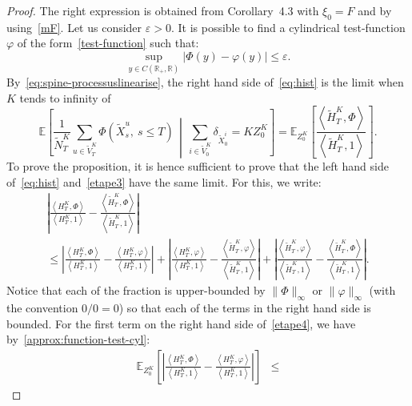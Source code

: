 \documentclass[10pt]{amsart}
\theoremstyle{definition}\newtheorem{defi}[theo]{Definition}\newtheorem{rema}[theo]{Remark}\newtheorem{exam}[theo]{Example}\newtheorem{exem}[theo]{Example}\newtheorem{nota}[theo]{Notation}
\newcommand*\R{\mathbb{R}}
\newcommand*\E{\mathbb{E}}
\begin{document}
\begin{proof}
The right expression is obtained from Corollary~4.3 with $\xi_{0}=F$ and by using~\eqref{mF}. Let us consider $\varepsilon>0$. It is possible to find a cylindrical test-function $\varphi$ of the form~\eqref{test-function} such that:
\begin{equation}\label{approx:function-test-cyl}
\sup_{y \in C(\R_+, \R)} \big|\Phi(y)-\varphi(y)\big|\leq \varepsilon.
\end{equation}
By~\eqref{eq:spine-processuslinearise}, the right hand side of~\eqref{eq:hist} is the limit when $K$ tends to infinity of
\begin{equation}\label{etape3}
\E\left[\frac{1}{\widetilde{N}^K_{T}}\sum_{u \in  \widetilde{V}^K_{T}}\Phi\left(\widetilde X^u_{s},\ s\leq T\right) \, \middle|\, \sum_{i \in \widetilde V^K_{0}} \delta_{\widetilde{X}^i_{0}}= K Z^K_0 \right] =\E_{Z^K_0}\left[\frac{\left\langle \widetilde{H}^K_T,\Phi\right\rangle}{\left\langle \widetilde{H}^K_T,1\right\rangle} \right].
\end{equation}
To prove the proposition, it is hence sufficient to prove that the left hand side of~\eqref{eq:hist} and~\eqref{etape3} have the same limit. For this, we write:
\begin{multline}\label{etape4}
\left| \frac{\left\langle H^K_T,\Phi\right\rangle}{\left\langle H^K_T,1\right\rangle} - \frac{\left\langle \widetilde{H}^K_T,\Phi\right\rangle}{\left\langle \widetilde{H}^K_T,1\right\rangle}\right|\\
\leq \left| \frac{\left\langle H^K_T,\Phi\right\rangle}{\left\langle H^K_T,1\right\rangle} - \frac{\left\langle H^K_T,\varphi\right\rangle}{\left\langle H^K_T,1\right\rangle}\right| + \left|\frac{\left\langle H^K_T,\varphi\right\rangle}{\left\langle H^K_T,1\right\rangle}-\frac{\left\langle \widetilde{H}^K_T,\varphi\right\rangle}{\left\langle \widetilde{H}^K_T,1\right\rangle}\right|
+\left|\frac{\left\langle \widetilde{H}^K_T,\varphi\right\rangle}{\left\langle \widetilde{H}^K_T,1\right\rangle}-\frac{\left\langle \widetilde{H}^K_T,\Phi\right\rangle}{\left\langle \widetilde{H}^K_T,1\right\rangle}\right|.
\end{multline}
Notice that each of the fraction is upper-bounded by $\|\Phi\|_\infty$ or $\|\varphi\|_\infty$ (with the convention $0/0=0$) so that each of the terms in the right hand side is bounded. For the first term on the right hand side of~\eqref{etape4}, we have by~\eqref{approx:function-test-cyl}:
\begin{align*}
\E_{Z^K_0}\left[\left| \frac{\left\langle H^K_T,\Phi\right\rangle}{\left\langle H^K_T,1\right\rangle} - \frac{\left\langle H^K_T,\varphi\right\rangle}{\left\langle H^K_T,1\right\rangle}\right|\right]&\leq

\end{align*}
\end{proof}
\end{document}
